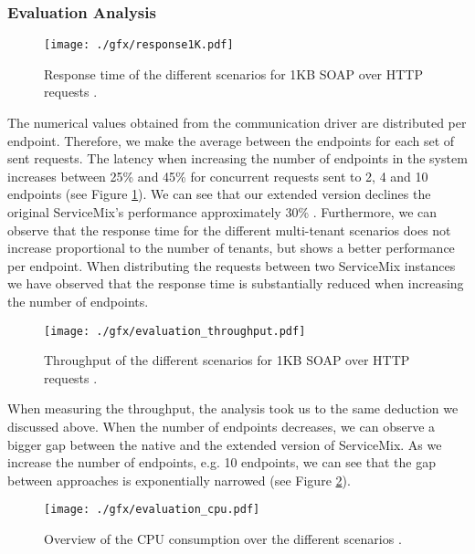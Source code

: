 	
	\subsubsection{Evaluation Analysis}
	
	\begin{figure}[htb]
		\centering
			\texttt{[image: ./gfx/response1K.pdf]}
		\caption[ESB Performance Evaluation Response time for 1KB Messages]{Response time of the different scenarios for 1KB \ac{SOAP} over \ac{HTTP} requests \cite{EvalESB}.}
		\label{fig:responsetime}
	\end{figure}
	
	The numerical values obtained from the communication driver are distributed per endpoint. Therefore, we make the average between the endpoints for each set of sent requests. The latency when increasing the number of endpoints in the system increases between 25\% and 45\% for concurrent requests sent to 2, 4 and 10 endpoints (see Figure \ref{fig:responsetime}). We can see that our extended version declines the original ServiceMix's performance approximately 30\% \cite{EvalESB}. Furthermore, we can observe that the response time for the different multi-tenant scenarios does not increase proportional to the number of tenants, but shows a better performance per endpoint. When distributing the requests between two ServiceMix instances we have observed that the response time is substantially reduced when increasing the number of endpoints.	
	
	\begin{figure}[htb]
		\centering
			\texttt{[image: ./gfx/evaluation\_throughput.pdf]}
		\caption[ESB Performance Evaluation Throughput for 1KB Messages]{Throughput of the different scenarios for 1KB \ac{SOAP} over \ac{HTTP} requests \cite{EvalESB}.}
		\label{fig:evaluationthroughput}
	\end{figure}
		
	When measuring the throughput, the analysis took us to the same deduction we discussed above. When the number of endpoints decreases, we can observe a bigger gap between the native and the extended version of ServiceMix. As we increase the number of endpoints, e.g. 10 endpoints, we can see that the gap between approaches is exponentially narrowed (see Figure \ref{fig:evaluationthroughput}).  
	
	\begin{figure}[htb]
		\centering
			\texttt{[image: ./gfx/evaluation\_cpu.pdf]}
		\caption[ESB Performance Evaluation CPU Consumption]{Overview of the CPU consumption over the different scenarios \cite{EvalESB}.}
		\label{fig:evaluationcpu}
	\end{figure}
	
